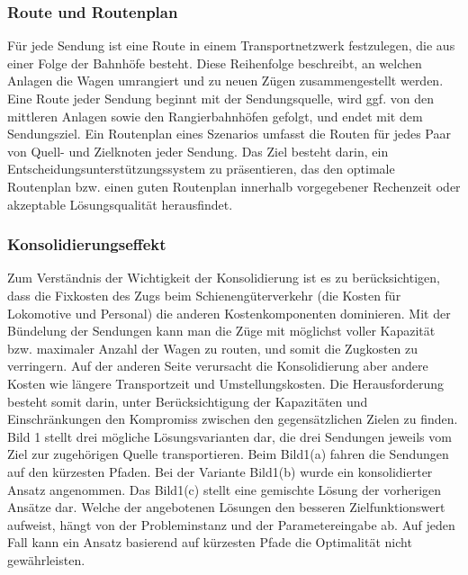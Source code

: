 \subsubsection{Route und Routenplan}
\label{subsec:routenplan}
Für jede Sendung ist eine Route in einem Transportnetzwerk festzulegen, die aus einer Folge der Bahnhöfe besteht. Diese Reihenfolge beschreibt, an welchen Anlagen die Wagen umrangiert und zu neuen Zügen zusammengestellt werden. Eine Route jeder Sendung beginnt mit der Sendungsquelle, wird ggf. von den mittleren Anlagen sowie den Rangierbahnhöfen gefolgt, und endet mit dem Sendungsziel. Ein Routenplan eines Szenarios umfasst die Routen für jedes Paar von Quell- und Zielknoten jeder Sendung. Das Ziel besteht darin, ein Entscheidungsunterstützungssystem zu präsentieren, das den optimale Routenplan bzw. einen guten Routenplan innerhalb vorgegebener Rechenzeit oder akzeptable Lösungsqualität herausfindet.

\subsubsection{Konsolidierungseffekt}
Zum Verständnis der Wichtigkeit der Konsolidierung ist es zu berücksichtigen, dass die Fixkosten des Zugs beim Schienengüterverkehr (die Kosten für Lokomotive und Personal) die anderen Kostenkomponenten dominieren. Mit der Bündelung der Sendungen kann man die Züge mit möglichst voller Kapazität bzw. maximaler Anzahl der Wagen zu routen, und somit die Zugkosten zu verringern. Auf der anderen Seite verursacht die Konsolidierung aber andere Kosten wie längere Transportzeit und Umstellungskosten. Die Herausforderung besteht somit darin, unter Berücksichtigung der Kapazitäten und Einschränkungen den Kompromiss zwischen den gegensätzlichen Zielen zu finden. Bild 1 stellt drei mögliche Lösungsvarianten dar, die drei Sendungen jeweils vom Ziel zur zugehörigen Quelle transportieren. Beim Bild1(a) fahren die Sendungen auf den kürzesten Pfaden. Bei der Variante Bild1(b) wurde ein konsolidierter Ansatz angenommen. Das Bild1(c) stellt eine gemischte Lösung der vorherigen Ansätze dar. Welche der angebotenen Lösungen den besseren Zielfunktionswert aufweist, hängt von der Probleminstanz und der Parametereingabe ab. Auf jeden Fall kann ein Ansatz basierend auf kürzesten Pfade die Optimalität nicht gewährleisten.

